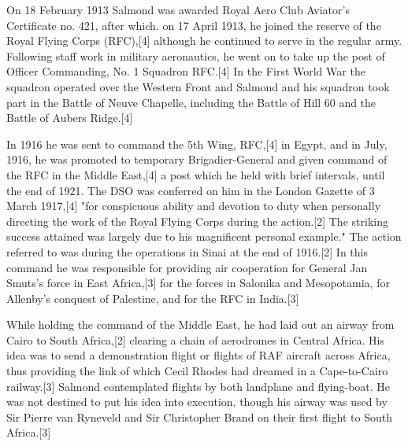 \documentclass[justified]{tufte-book}
\begin{document}
On 18 February 1913 Salmond was awarded Royal Aero Club Aviator's Certificate no. 421, after which. on 17 April 1913, he joined the reserve of the Royal Flying Corps (RFC),[4] although he continued to serve in the regular army. Following staff work in military aeronautics, he went on to take up the post of Officer Commanding, No. 1 Squadron RFC.[4] In the First World War the squadron operated over the Western Front and Salmond and his squadron took part in the Battle of Neuve Chapelle, including the Battle of Hill 60 and the Battle of Aubers Ridge.[4]

In 1916 he was sent to command the 5th Wing, RFC,[4] in Egypt, and in July, 1916, he was promoted to temporary Brigadier-General and given command of the RFC in the Middle East,[4] a post which he held with brief intervals, until the end of 1921. The DSO was conferred on him in the London Gazette of 3 March 1917,[4] "for conspicuous ability and devotion to duty when personally directing the work of the Royal Flying Corps during the action.[2] The striking success attained was largely due to his magnificent personal example." The action referred to was during the operations in Sinai at the end of 1916.[2] In this command he was responsible for providing air cooperation for General Jan Smuts's force in East Africa,[3] for the forces in Salonika and Mesopotamia, for Allenby's conquest of Palestine, and for the RFC in India.[3]

While holding the command of the Middle East, he had laid out an airway from Cairo to South Africa,[2] clearing a chain of aerodromes in Central Africa. His idea was to send a demonstration flight or flights of RAF aircraft across Africa, thus providing the link of which Cecil Rhodes had dreamed in a Cape-to-Cairo railway.[3] Salmond contemplated flights by both landplane and flying-boat. He was not destined to put his idea into execution, though his airway was used by Sir Pierre van Ryneveld and Sir Christopher Brand on their first flight to South Africa.[3]
\newpage


\newpage


\newpage



\newpage
{}

\newpage
{}

\end{document}
